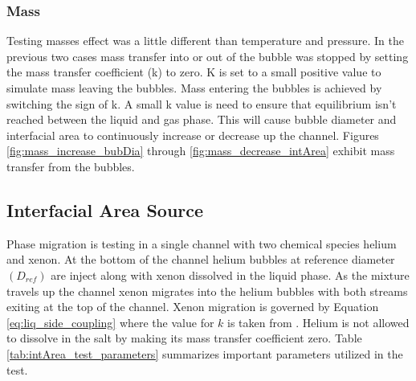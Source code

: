 \subsubsection{Mass}
Testing masses effect was a little different than temperature and pressure. In the previous two cases mass transfer into or out of the bubble was stopped by setting the mass transfer coefficient (k) to zero. K is set to a small positive value to simulate mass leaving the bubbles. Mass entering the bubbles is achieved by switching the sign of k. A small k value is need to ensure that equilibrium isn't reached between the liquid and gas phase. This will cause bubble diameter and interfacial area to continuously increase or decrease up the channel. Figures \ref{fig:mass_increase_bubDia} through \ref{fig:mass_decrease_intArea} exhibit mass transfer from the bubbles.

\subsection{Interfacial Area Source}
Phase migration is testing in a single channel with two chemical species helium and xenon. At the bottom of the channel helium bubbles at reference diameter $(D_{ref})$ are inject along with xenon dissolved in the liquid phase. As the mixture travels up the channel xenon migrates into the helium bubbles with both streams exiting at the top of the channel. Xenon migration is governed by Equation \ref{eq:liq_side_coupling} where the value for $k$ is taken from \cite{houtzeel1967}. Helium is not allowed to dissolve in the salt by making its mass transfer coefficient zero. Table \ref{tab:intArea_test_parameters} summarizes important parameters utilized in the test.  

\FloatBarrier
\newpage

